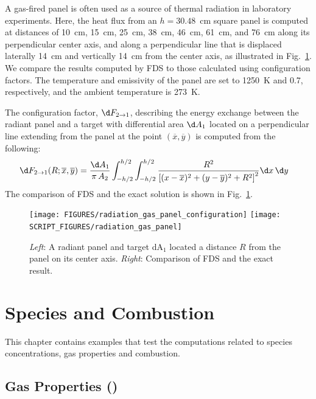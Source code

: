\documentclass[11pt]{book}
\begin{document}
A gas-fired panel is often used as a source of thermal radiation in laboratory experiments.  Here, the heat flux from an $h=30.48$~cm square panel is computed at distances of 10~cm, 15~cm, 25~cm, 38~cm, 46~cm, 61~cm, and 76~cm along its perpendicular center axis, and along a perpendicular line that is displaced laterally 14~cm and vertically 14~cm from the center axis, as illustrated in Fig.~\ref{radiation_gas_panel_plot}.  We compare the results computed by FDS to those calculated using configuration factors. The temperature and emissivity of the panel are set to 1250~K and 0.7, respectively, and the ambient temperature is 273~K.

The configuration factor, $\d F_{2 \rightarrow 1}$, describing the energy exchange between the radiant panel and a target with differential area $\d A_1$ located on a perpendicular line extending from the panel at the point  $(\overline{x}, \overline{y})$ is computed from the following:
\begin{align}
 \d F_{2 \rightarrow 1} (R; \overline{x}, \overline{y})
    &= \frac{\d A_1}{\pi \, A_2}
        \int_{-h/2}^{h/2} \int_{-h/2}^{h/2} \frac{R^2}{\left[ (x-\overline{x})^2 + (y-\overline{y})^2 + R^2 \right]^2} \d x \, \d y
 \label{eq:2->d1 configuration factor - general}
\end{align}
The comparison of FDS and the exact solution is shown in Fig.~\ref{radiation_gas_panel_plot}.

\begin{figure}[ht]
\centering
\texttt{[image: FIGURES/radiation\_gas\_panel\_configuration]}
\texttt{[image: SCRIPT\_FIGURES/radiation\_gas\_panel]}
\caption[The  case]{\emph{Left}: A radiant panel and target dA$_1$ located a distance $R$ from the panel on its center axis.  \emph{Right}: Comparison of FDS and the exact result.}
\label{radiation_gas_panel_plot}
\end{figure}



\chapter{Species and Combustion}

This chapter contains examples that test the computations related to species concentrations, gas properties and combustion.

\section{Gas Properties (\texorpdfstring{}{species\_props})}
\label{gas_properties}
\label{species_props}
\end{document}
